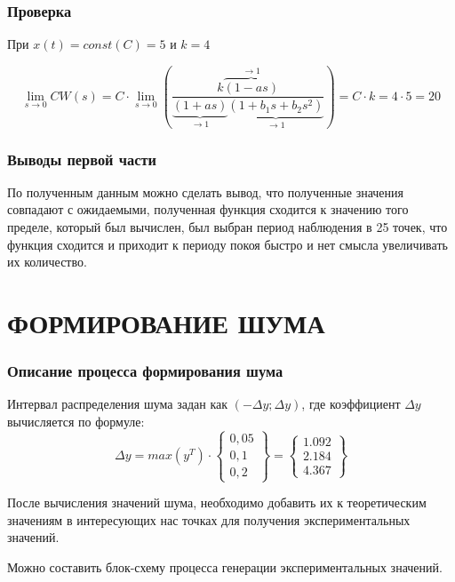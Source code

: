 \documentclass[a4paper, 12pt]{article}
\begin{document}
\newpage

\section{Проверка}

При $x(t) = const (C) = 5$ и $k = 4$

$$
    \lim_{s\to0}CW(s) = C \cdot \lim_{s\to0}\left(\dfrac{k\overbrace{(1-as)}^{\to1}}{\underbrace{(1+as)}_{\to1}\underbrace{(1+b_1s+b_2s^2)}_{\to1}}\right) = C \cdot k = 4 \cdot 5 = 20
$$

\section{Выводы первой части}
По полученным данным можно сделать вывод, что полученные значения совпадают с ожидаемыми, полученная функция сходится к значению того пределе, который был вычислен, был выбран период наблюдения в 25 точек, что функция сходится и приходит к периоду покоя быстро и нет смысла увеличивать их количество.

\part{ФОРМИРОВАНИЕ ШУМА}
\setcounter{section}{0}
\section{Описание процесса формирования шума}
Интервал распределения шума задан как $ (-\Delta y; \Delta y) $, где коэффициент $\Delta y$ вычисляется по формуле:
$$
    \Delta y = max(y^{T}) \cdot
    \begin{Bmatrix}
        0,05 \\
        0,1 \\
        0,2
    \end{Bmatrix}
    =
    \begin{Bmatrix}
        1.092 \\
        2.184 \\
        4.367
    \end{Bmatrix}
$$

После вычисления значений шума, необходимо добавить их к теоретическим значениям в интересующих нас точках для получения экспериментальных значений.

Можно составить блок-схему процесса генерации экспериментальных значений.
\end{document}
